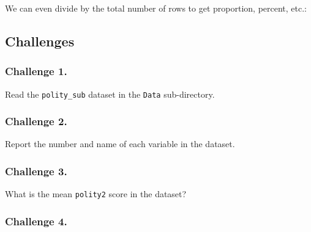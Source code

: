\documentclass[]{book}
\newenvironment{Shaded}{\begin{snugshade}}{\end{snugshade}}
\newcommand{\KeywordTok}[1]{\textcolor[rgb]{0.13,0.29,0.53}{\textbf{#1}}}
\newcommand{\DecValTok}[1]{\textcolor[rgb]{0.00,0.00,0.81}{#1}}
\newcommand{\CommentTok}[1]{\textcolor[rgb]{0.56,0.35,0.01}{\textit{#1}}}
\newcommand{\OperatorTok}[1]{\textcolor[rgb]{0.81,0.36,0.00}{\textbf{#1}}}
\newcommand{\NormalTok}[1]{#1}
\begin{document}
We can even divide by the total number of rows to get proportion,
percent, etc.:

\begin{Shaded}
\end{Shaded}

\subsection{Challenges}\label{challenges-5}

\subsubsection*{Challenge 1.}\label{challenge-1.-2}

Read the \texttt{polity\_sub} dataset in the \texttt{Data}
sub-directory.

\subsubsection*{Challenge 2.}\label{challenge-2.-1}

Report the number and name of each variable in the dataset.

\subsubsection*{Challenge 3.}\label{challenge-3.-1}

What is the mean \texttt{polity2} score in the dataset?

\subsubsection*{Challenge 4.}\label{challenge-4.}
\end{document}
